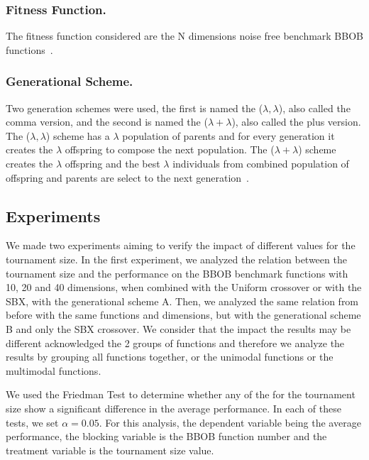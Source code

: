 \subsubsection*{Fitness Function.}
The fitness function considered are the N dimensions noise free benchmark BBOB functions~\cite{hansen2010real}.





\subsubsection*{Generational Scheme.}
Two generation schemes were used, the first is named the ($\lambda, \lambda$), also called the comma version, and the second is named the ($\lambda + \lambda$), also called the plus version. The ($\lambda, \lambda$) scheme has a $\lambda$ population of parents and for every generation it creates the $\lambda$ offspring to compose the next population. The ($\lambda + \lambda$) scheme creates the $\lambda$ offspring and the best $\lambda$ individuals from combined population of offspring and parents are select to the next generation~\cite{pilat2017parallel}.

\label{sec:experiment}

\subsection{Experiments}
We made two experiments aiming to verify the impact of different values for the tournament size. In the first experiment, we analyzed the relation between the tournament size and the performance on the BBOB benchmark functions with 10, 20 and 40 dimensions, when combined with the Uniform crossover or with the SBX, with the generational scheme A. Then, we analyzed the same relation from before with the same functions and dimensions, but with the generational scheme B and only the SBX crossover. We consider that the impact the results may be different acknowledged the 2 groups of functions and therefore we analyze the results by grouping all functions together, or the unimodal functions or the multimodal functions. 

We used the Friedman Test to determine whether any of the for the tournament size show a significant difference in the average performance. In each of these tests, we set $\alpha = 0.05$. For this analysis, the dependent variable being the average performance, the blocking variable is the BBOB function number and the treatment variable is the tournament size value.



